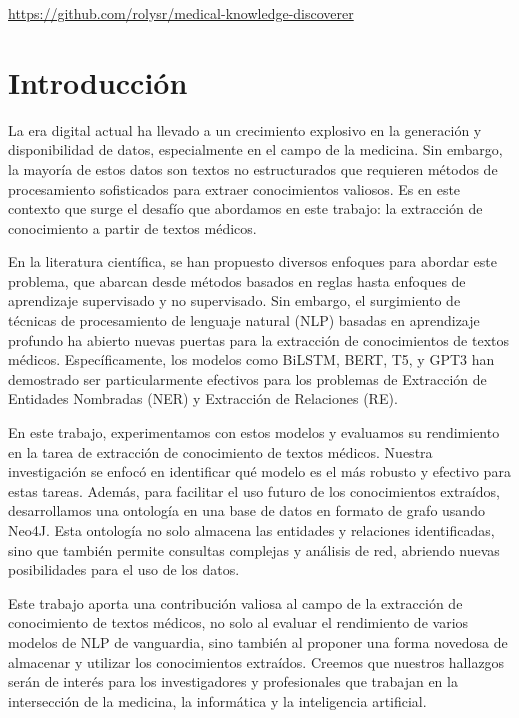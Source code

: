 \documentclass[10pt]{article} %
\begin{document}
	\begin{center}
		\url{https://github.com/rolysr/medical-knowledge-discoverer}
	\end{center}

	\section{Introducci\'on}
	
	La era digital actual ha llevado a un crecimiento explosivo en la generación y disponibilidad de datos, especialmente en el campo de la medicina. Sin embargo, la mayoría de estos datos son textos no estructurados que requieren métodos de procesamiento sofisticados para extraer conocimientos valiosos. Es en este contexto que surge el desafío que abordamos en este trabajo: la extracción de conocimiento a partir de textos médicos.
	
	En la literatura científica, se han propuesto diversos enfoques para abordar este problema, que abarcan desde métodos basados en reglas hasta enfoques de aprendizaje supervisado y no supervisado. Sin embargo, el surgimiento de técnicas de procesamiento de lenguaje natural (NLP) basadas en aprendizaje profundo ha abierto nuevas puertas para la extracción de conocimientos de textos médicos. Específicamente, los modelos como BiLSTM, BERT, T5, y GPT3 han demostrado ser particularmente efectivos para los problemas de Extracción de Entidades Nombradas (NER) y Extracción de Relaciones (RE). 
	
	En este trabajo, experimentamos con estos modelos y evaluamos su rendimiento en la tarea de extracción de conocimiento de textos médicos. Nuestra investigación se enfocó en identificar qué modelo es el más robusto y efectivo para estas tareas. Además, para facilitar el uso futuro de los conocimientos extraídos, desarrollamos una ontología en una base de datos en formato de grafo usando Neo4J. Esta ontología no solo almacena las entidades y relaciones identificadas, sino que también permite consultas complejas y análisis de red, abriendo nuevas posibilidades para el uso de los datos.
	
	Este trabajo aporta una contribución valiosa al campo de la extracción de conocimiento de textos médicos, no solo al evaluar el rendimiento de varios modelos de NLP de vanguardia, sino también al proponer una forma novedosa de almacenar y utilizar los conocimientos extraídos. Creemos que nuestros hallazgos serán de interés para los investigadores y profesionales que trabajan en la intersección de la medicina, la informática y la inteligencia artificial.
	
\end{document}
